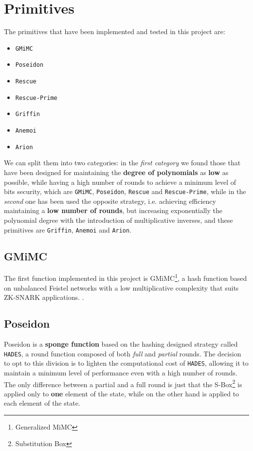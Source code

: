 \documentclass[12pt, a4paper]{report}
\begin{document}
\section{Primitives}\label{sec:primitives}

The primitives that have been implemented and tested in this project are:
\begin{itemize}
  \item \texttt{GMiMC}
  \item \texttt{Poseidon}
  \item \texttt{Rescue}
  \item \texttt{Rescue-Prime}
  \item \texttt{Griffin}
  \item \texttt{Anemoi}
  \item \texttt{Arion}
\end{itemize}

We can split them into two categories: in the \textit{first category} we found those that have been designed for maintaining the \textbf{degree of polynomials} as \textbf{low} as possible, while having a high number of rounds to achieve a minimum level of bits security, which are \texttt{GMiMC}, \texttt{Poseidon}, \texttt{Rescue} and \texttt{Rescue-Prime}, while in the \textit{second} one has been used the opposite strategy, i.e. achieving efficiency maintaining a \textbf{low number of rounds}, but increasing exponentially the polynomial degree with the introduction of multiplicative inverses, and these primitives are \texttt{Griffin}, \texttt{Anemoi} and \texttt{Arion}.

\subsection{GMiMC}\label{subsec:gmimc}

The first function implemented in this project is GMiMC\footnote{Generalized MiMC}, a hash function based on unbalanced Feistel networks with a low multiplicative complexity that suits ZK-SNARK applications. \cite{gmimc}.

\subsection{Poseidon}\label{subsec:poseidon}

Poseidon is a \textbf{sponge function} based on the hashing designed strategy called \texttt{HADES}, a round function composed of both \textit{full} and \textit{partial} rounds.
The decision to opt to this division is to lighten the computational cost of \texttt{HADES}, allowing it to maintain a minimum level of performance even with a high number of rounds. The only difference between a partial and a full round is just that the S-Box\footnote{Substitution Box} is applied only to \textbf{one} element of the state, while on the other hand is applied to each element of the state.
\end{document}
